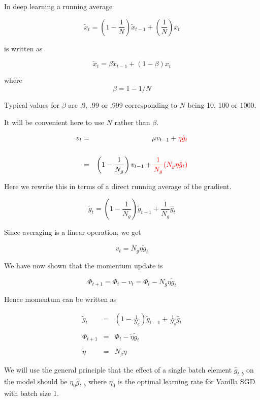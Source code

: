 {

In deep learning a running average

$$\tilde{x}_t = \left(1-\frac{1}{N}\right)\tilde{x}_{t-1} + \left(\frac{1}{N}\right)x_t$$

\vfill
is written as

$$\tilde{x}_t = \beta\tilde{x}_{t-1} + (1-\beta)x_t$$

\vfill
where
$$\beta = 1 - 1/N$$

\vfill
Typical values for $\beta$ are .9, .99 or .999 corresponding to $N$ being 10, 100 or 1000.

\vfill
It will be convenient here to use $N$ rather than $\beta$.


\begin{eqnarray*}
v_t & = & \mu v_{t-1} + {\color{red} \eta \hat{g}_t} \\
\\
& = & \left(1-\frac{1}{N_g}\right) v_{t-1} + {\color{red} \frac{1}{N_g}(N_g\eta \hat{g}_t)}
\end{eqnarray*}

\vfill
Here we rewrite this in terms of a direct running average of the gradient.

$$\tilde{g}_t = \left(1-\frac{1}{N_g}\right)\tilde{g}_{t-1} + \frac{1}{N_g} \hat{g}_t$$

\vfill
Since averaging is a linear operation, we get

$$v_t = N_g \eta \tilde{g}_t$$


We have now shown that the momentum update is

$$\Phi_{t+1}  =  \Phi_t - v_t  = \Phi_t - N_g\eta\tilde{g}_t$$

\vfill
Hence momentum can be written as

\begin{eqnarray*}
\tilde{g}_t & = & \left(1-\frac{1}{N_g}\right)\tilde{g}_{t-1} + \frac{1}{N_g} \hat{g}_t \\
\\
\Phi_{t+1} & = &  \Phi_t - \tilde{\eta}\tilde{g}_t \\
\\
\tilde{\eta} & = & N_g\eta
\end{eqnarray*}


We will use the general principle that the effect of a single batch element $\hat{g}_{t,b}$ on the model should be $\eta_0\hat{g}_{t,b}$ where $\eta_0$ is the optimal learning rate
for Vanilla SGD with batch size 1.

}
